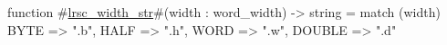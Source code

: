 function #\hyperref[sailRISCVzlrsczywidthzystr]{lrsc\_width\_str}#(width : word_width) -> string =
  match (width) {
    BYTE   => ".b",
    HALF   => ".h",
    WORD   => ".w",
    DOUBLE => ".d"
  }
